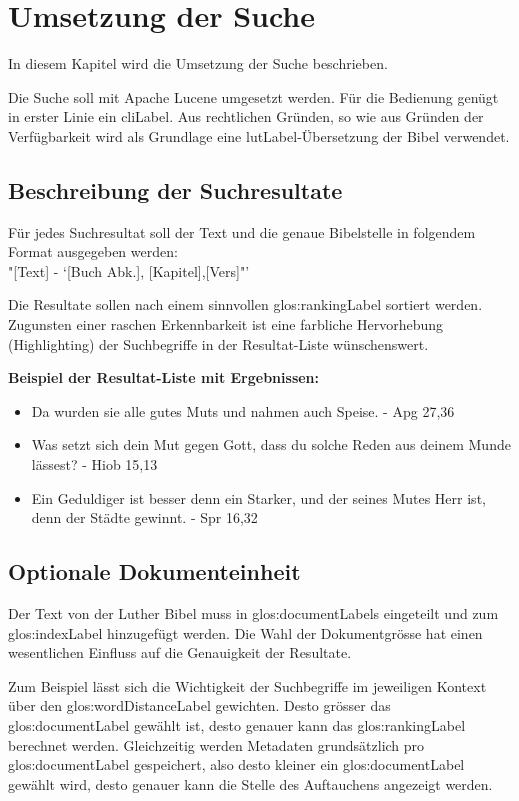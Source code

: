 \chapter{Umsetzung der Suche}
In diesem Kapitel wird die Umsetzung der Suche beschrieben.

Die Suche soll mit Apache Lucene umgesetzt werden. Für die Bedienung genügt in erster Linie ein \gls{cliLabel}.
Aus rechtlichen Gründen, so wie aus Gründen der Verfügbarkeit wird als Grundlage eine \gls{lutLabel}-Übersetzung der Bibel verwendet.

\section{Beschreibung der Suchresultate}
Für jedes Suchresultat soll der Text und die genaue Bibelstelle in folgendem Format ausgegeben werden:\\
"[Text] - `[Buch Abk.], [Kapitel],[Vers]"'

Die Resultate sollen nach einem sinnvollen \gls{glos:rankingLabel} sortiert werden.
Zugunsten einer raschen Erkennbarkeit ist eine farbliche Hervorhebung (Highlighting) der Suchbegriffe in der Resultat-Liste wünschenswert.

\textbf{Beispiel der Resultat-Liste mit Ergebnissen:}
\begin{itemize}
	\item Da wurden sie alle gutes Muts und nahmen auch Speise. - Apg 27,36
	\item Was setzt sich dein Mut gegen Gott, dass du solche Reden aus deinem Munde lässest? - Hiob 15,13
	\item Ein Geduldiger ist besser denn ein Starker, und der seines Mutes Herr ist, denn der Städte gewinnt. - Spr 16,32
\end{itemize}


\section{Optionale Dokumenteinheit}
Der Text von der Luther Bibel muss in \glspl{glos:documentLabel} eingeteilt und zum \gls{glos:indexLabel} hinzugefügt werden.
Die Wahl der Dokumentgrösse hat einen wesentlichen Einfluss auf die Genauigkeit der Resultate.

Zum Beispiel lässt sich die Wichtigkeit der Suchbegriffe im jeweiligen Kontext über den \gls{glos:wordDistanceLabel} gewichten.
Desto grösser das \gls{glos:documentLabel} gewählt ist, desto genauer kann das \gls{glos:rankingLabel} berechnet werden.
Gleichzeitig werden Metadaten grundsätzlich pro \gls{glos:documentLabel} gespeichert, also desto kleiner ein \gls{glos:documentLabel} gewählt wird, desto genauer kann die Stelle des Auftauchens angezeigt werden.

